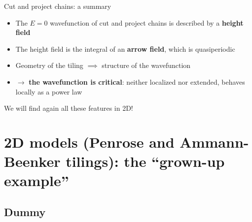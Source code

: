 \documentclass[xcolor=x11names,compress,professionalfonts, aspectratio=169]{beamer}
\renewcommand{\(}{\begin{columns}}
\renewcommand{\)}{\end{columns}}
\newcommand{\<}[1]{\begin{column}{#1}}
\renewcommand{\>}{\end{column}}
\begin{document}
\begin{frame}{Cut and project chains: a summary}
\begin{itemize}
	\item The $E=0$ wavefunction of cut and project chains is described by a \textbf{height field}
	\item The height field is the integral of an \textbf{arrow field}, which is quasiperiodic
	\item Geometry of the tiling $\implies$ structure of the wavefunction
	\item $\rightarrow$ \textbf{the wavefunction is critical}: neither localized nor extended, behaves locally as a power law
\end{itemize}
We will find again all these features in 2D!
\end{frame}

\section{2D models (Penrose and Ammann-Beenker tilings): the ``grown-up example''}
\subsection{Dummy}
\end{document}
